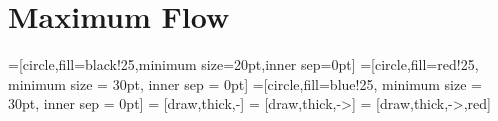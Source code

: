 \section{Maximum Flow}
  =[circle,fill=black!25,minimum size=20pt,inner sep=0pt]
  =[circle,fill=red!25, minimum size = 30pt, inner sep = 0pt]
  =[circle,fill=blue!25, minimum size = 30pt, inner sep = 0pt]
   = [draw,thick,-]
   = [draw,thick,->]
   = [draw,thick,->,red]
  
